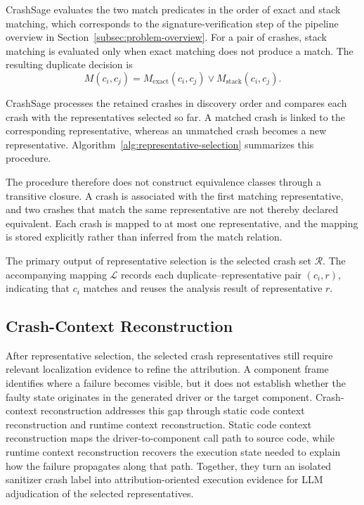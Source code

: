 \documentclass[pdflatex,sn-basic]{sn-jnl}%
\theoremstyle{thmstyleone}%
\theoremstyle{thmstyletwo}%
\theoremstyle{thmstylethree}%
\begin{document}
CrashSage evaluates the two match predicates in the order of exact and stack matching, which corresponds to the signature-verification step of the pipeline overview in Section~\ref{subsec:problem-overview}.
For a pair of crashes, stack matching is evaluated only when exact matching does not produce a match.
The resulting duplicate decision is
\begin{equation*}
M(c_i,c_j)=
M_{\mathrm{exact}}(c_i,c_j)
\lor M_{\mathrm{stack}}(c_i,c_j).
\end{equation*}

CrashSage processes the retained crashes in discovery order and compares each crash with the representatives selected so far.
A matched crash is linked to the corresponding representative, whereas an unmatched crash becomes a new representative.
Algorithm~\ref{alg:representative-selection} summarizes this procedure.

{\color{blue}The procedure therefore does not construct equivalence classes through a transitive closure. A crash is associated with the first matching representative, and two crashes that match the same representative are not thereby declared equivalent. Each crash is mapped to at most one representative, and the mapping is stored explicitly rather than inferred from the match relation.}

The primary output of representative selection is the selected crash set \(\mathcal{R}\).
The accompanying mapping \(\mathcal{L}\) records each duplicate--representative pair \((c_i,r)\), indicating that \(c_i\) matches and reuses the analysis result of representative \(r\).

\subsection{Crash-Context Reconstruction}

After representative selection, the selected crash representatives still require relevant localization evidence to refine the attribution.
A component frame identifies where a failure becomes visible, but it does not establish whether the faulty state originates in the generated driver or the target component.
Crash-context reconstruction addresses this gap through static code context reconstruction and runtime context reconstruction.
Static code context reconstruction maps the driver-to-component call path to source code, while runtime context reconstruction recovers the execution state needed to explain how the failure propagates along that path.
Together, they turn an isolated sanitizer crash label into attribution-oriented execution evidence for LLM adjudication of the selected representatives.
\end{document}
